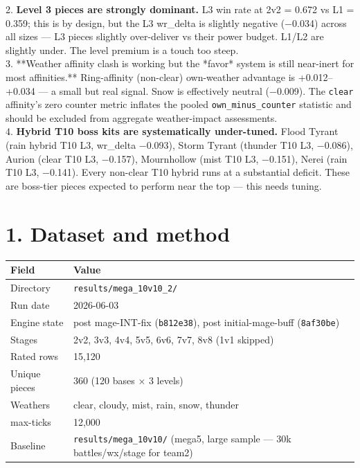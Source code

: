 \documentclass[10pt]{article}
\begin{document}
2. \textbf{Level 3 pieces are strongly dominant.} L3 win rate at 2v2 = 0.672 vs L1 = 0.359; this is by design, but the L3 wr\_delta is slightly negative (−0.034) across all sizes --- L3 pieces slightly over-deliver vs their power budget. L1/L2 are slightly under. The level premium is a touch too steep.\\

3. **Weather affinity clash is working but the *favor* system is still near-inert for most affinities.** Ring-affinity (non-clear) own-weather advantage is +0.012--+0.034 --- a small but real signal. Snow is effectively neutral (−0.009). The \texttt{clear} affinity's zero counter metric inflates the pooled \texttt{own\_\allowbreak{}minus\_\allowbreak{}counter} statistic and should be excluded from aggregate weather-impact assessments.\\

4. \textbf{Hybrid T10 boss kits are systematically under-tuned.} Flood Tyrant (rain hybrid T10 L3, wr\_delta −0.093), Storm Tyrant (thunder T10 L3, −0.086), Aurion (clear T10 L3, −0.157), Mournhollow (mist T10 L3, −0.151), Nerei (rain T10 L3, −0.141). Every non-clear T10 hybrid runs at a substantial deficit. These are boss-tier pieces expected to perform near the top --- this needs tuning.\\


\section*{1. Dataset and method}

\medskip
\begin{tabularx}{\linewidth}{LL}
\toprule
\textbf{Field} & \textbf{Value} \\
\midrule
Directory & \texttt{results/\allowbreak{}mega\_\allowbreak{}10v10\_\allowbreak{}2/\allowbreak{}} \\
Run date & 2026-06-03 \\
Engine state & post mage-INT-fix (\texttt{b812e38}), post initial-mage-buff (\texttt{8af30be}) \\
Stages & 2v2, 3v3, 4v4, 5v5, 6v6, 7v7, 8v8 (1v1 skipped) \\
Rated rows & 15,120 \\
Unique pieces & 360 (120 bases $\times$ 3 levels) \\
Weathers & clear, cloudy, mist, rain, snow, thunder \\
max-ticks & 12,000 \\
Baseline & \texttt{results/\allowbreak{}mega\_\allowbreak{}10v10/\allowbreak{}} (mega5, large sample --- 30k battles/wx/stage for team2) \\
\bottomrule
\end{tabularx}
\medskip
\end{document}
